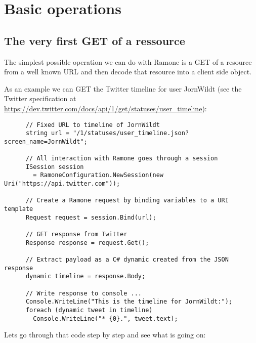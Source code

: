 \chapter{Basic operations}

\section{The very first GET of a ressource}

The simplest possible operation we can do with Ramone is a GET of a resource 
from a well known URL and then decode that resource into a client side object.

As an example we can GET the Twitter timeline for user JornWildt (see the
Twitter specification at 
\url{https://dev.twitter.com/docs/api/1/get/statuses/user\_timeline}):

\lstset{style=sharpc}
\begin{lstlisting}
      // Fixed URL to timeline of JornWildt
      string url = "/1/statuses/user_timeline.json?screen_name=JornWildt";

      // All interaction with Ramone goes through a session
      ISession session
        = RamoneConfiguration.NewSession(new Uri("https://api.twitter.com"));

      // Create a Ramone request by binding variables to a URI template
      Request request = session.Bind(url);

      // GET response from Twitter
      Response response = request.Get();

      // Extract payload as a C# dynamic created from the JSON response
      dynamic timeline = response.Body;

      // Write response to console ...
      Console.WriteLine("This is the timeline for JornWildt:");
      foreach (dynamic tweet in timeline)
        Console.WriteLine("* {0}.", tweet.text);
\end{lstlisting}

Lets go through that code step by step and see what is going on:

